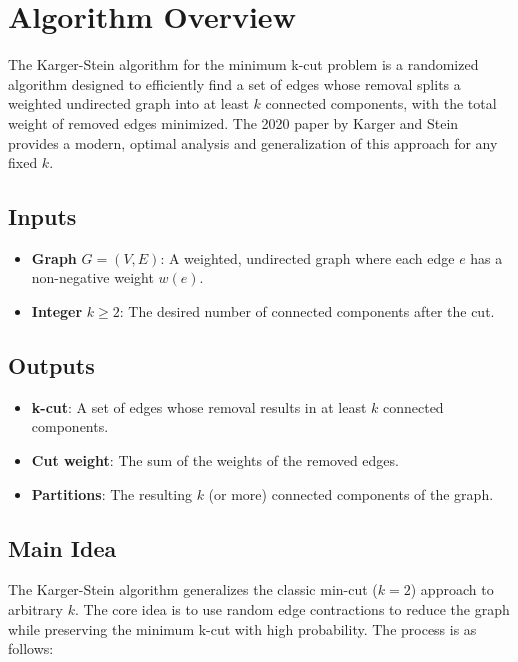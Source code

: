 \documentclass[11pt]{article}
\begin{document}
\section{Algorithm Overview}

The Karger-Stein algorithm for the minimum k-cut problem is a randomized algorithm designed to efficiently find a set of edges whose removal splits a weighted undirected graph into at least \( k \) connected components, with the total weight of removed edges minimized. The 2020 paper by Karger and Stein provides a modern, optimal analysis and generalization of this approach for any fixed \( k \).

\subsection{Inputs}
\begin{itemize}
    \item \textbf{Graph} \( G = (V, E) \): A weighted, undirected graph where each edge \( e \) has a non-negative weight \( w(e) \).
    \item \textbf{Integer} \( k \geq 2 \): The desired number of connected components after the cut.
\end{itemize}

\subsection{Outputs}
\begin{itemize}
    \item \textbf{k-cut}: A set of edges whose removal results in at least \( k \) connected components.
    \item \textbf{Cut weight}: The sum of the weights of the removed edges.
    \item \textbf{Partitions}: The resulting \( k \) (or more) connected components of the graph.
\end{itemize}

\subsection{Main Idea}
The Karger-Stein algorithm generalizes the classic min-cut (\( k=2 \)) approach to arbitrary \( k \). The core idea is to use random edge contractions to reduce the graph while preserving the minimum k-cut with high probability. The process is as follows:
\end{document}
